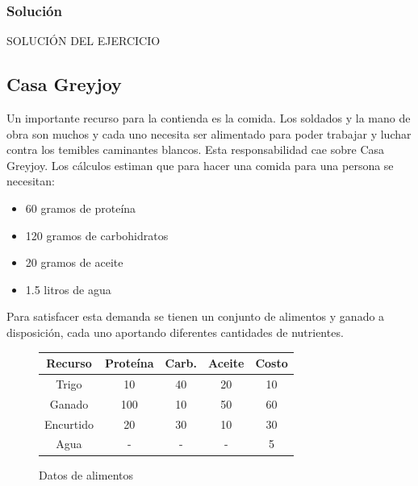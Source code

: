 \documentclass[a4paper,10pt,twocolumn]{article}
\theoremstyle{theorem}
\theoremstyle{definition}
\theoremstyle{remark}
\begin{document}
		\subsubsection{Solución}\label{subsubsec:sol_ejer_1}

SOLUCIÓN DEL EJERCICIO

	\subsection{Casa Greyjoy}\label{subsec:ejer_2}
Un importante recurso para la contienda es la comida. Los soldados y la mano de obra son muchos y cada uno necesita ser alimentado para poder trabajar y luchar contra los temibles caminantes blancos. Esta responsabilidad cae sobre Casa Greyjoy. Los cálculos estiman que para hacer una comida para una persona se necesitan:

\begin{itemize}

	\item 60  gramos de proteína
	\item 120 gramos de carbohidratos
	\item 20  gramos de aceite
	\item 1.5 litros de agua

\end{itemize}

Para satisfacer esta demanda se tienen un conjunto de alimentos y ganado a disposición, cada uno aportando diferentes cantidades de nutrientes.

\begin{figure}[h!]%
	\begin{center}
		\begin{tabular}{|c|c|c|c|c|} \hline
		Recurso		& Proteína 	& Carb. 	& Aceite   & Costo  \\ \hline
		Trigo		& 10		& 40				& 20	  & 10		\\ \hline
		Ganado		&100		& 10				& 50	  & 60		\\ \hline
		Encurtido	& 20		& 30				& 10	  & 30		\\ \hline
		Agua		& -			& -					& -		  & 5		\\ \hline
		\end{tabular}
	\caption{Datos de alimentos}\label{fig:ejer_2}
	\end{center}
\end{figure}
\end{document}
